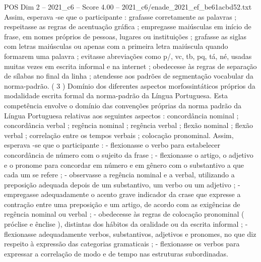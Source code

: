 \begin{textsample}{POS Dim 2 – 2021\_c6 – Score 4.00 – 2021\_c6/enade\_2021\_ef\_be61acbd52.txt}
Assim, esperava -se que o participante : grafasse corretamente as palavras ; respeitasse as regras de acentuação gráfica ; empregasse maiúsculas em início de frase, em nomes próprios de pessoas, lugares ou instituições ; grafasse as siglas com letras maiúsculas ou apenas com a primeira letra maiúscula quando formarem uma palavra ; evitasse abreviações como p/, vc, tb, pq, tá, né, usadas muitas vezes em escrita informal e na internet ; obedecesse às regras de separação de sílabas no final da linha ; atendesse aos padrões de segmentação vocabular da norma-padrão. ( 3 ) Domínio dos diferentes aspectos morfossintáticos próprios da modalidade escrita formal da norma-padrão da Língua Portuguesa.
Esta competência envolve o domínio das convenções próprias da norma padrão da Língua Portuguesa relativas aos seguintes aspectos : concordância nominal ; concordância verbal ; regência nominal ; regência verbal ; flexão nominal ; flexão verbal ; correlação entre os tempos verbais ; colocação pronominal.
Assim, esperava -se que o participante : - flexionasse o verbo para estabelecer concordância de número com o sujeito da frase ; - flexionasse o artigo, o adjetivo e o pronome para concordar em número e em gênero com o substantivo a que cada um se refere ; - observasse a regência nominal e a verbal, utilizando a preposição adequada depois de um substantivo, um verbo ou um adjetivo ; - empregasse adequadamente o acento grave indicador da crase que expresse a contração entre uma preposição e um artigo, de acordo com as exigências de regência nominal ou verbal ; - obedecesse às regras de colocação pronominal ( próclise e ênclise ), distintas dos hábitos da oralidade ou da escrita informal ; - flexionasse adequadamente verbos, substantivos, adjetivos e pronomes, no que diz respeito à expressão das categorias gramaticais ; - flexionasse os verbos para expressar a correlação de modo e de tempo nas estruturas subordinadas.

\end{textsample}
